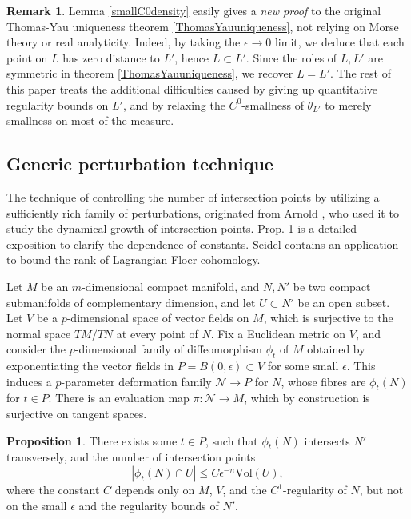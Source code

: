 \documentclass[a4paper]{article}
\theoremstyle{definition}
\newtheorem{rmk}{Remark}
\newtheorem{prop}[thm]{Proposition}
\begin{document}
\begin{rmk}
Lemma \ref{smallC0density} easily gives a \emph{new proof} to the original Thomas-Yau uniqueness theorem \ref{ThomasYauuniqueness}, not relying on Morse theory or real analyticity. Indeed, by taking the $\epsilon\to 0$ limit, we deduce that each point on $L$ has zero distance to $L'$, hence $L\subset L'$. Since the roles of $L,L'$ are symmetric in theorem \ref{ThomasYauuniqueness}, we recover $L=L'$. The rest of this paper treats the additional difficulties caused by giving up quantitative regularity bounds on $L'$, and by relaxing the $C^0$-smallness of $\theta_{L'}$ to merely smallness on most of the measure.
\end{rmk}



\subsection{Generic perturbation technique}



The technique of controlling the number of intersection points by utilizing a sufficiently rich family of perturbations, originated from Arnold \cite{Arnold}, who used it to study the dynamical growth of intersection points.  Prop. \ref{Arnold} is a detailed exposition to clarify the dependence of constants. Seidel \cite[Lecture 5]{Seidel} contains an application to bound the rank of Lagrangian Floer cohomology.







Let $M$ be an $m$-dimensional compact manifold, and $N, N'$ be two compact submanifolds of complementary dimension, and let $U\subset N'$ be an open subset. 
Let $V$ be a $p$-dimensional space of vector fields on $M$, which is surjective to the normal space $TM/TN$ at every point of $N$. Fix a Euclidean metric on $V$, and consider the $p$-dimensional family of diffeomorphism $\phi_t$ of $M$ obtained by exponentiating the vector fields in $P=B(0,\epsilon)\subset V$ for some small  $\epsilon$.  This induces a $p$-parameter deformation family 
$\mathcal{N}\to P$ for $N$, whose fibres are $\phi_t(N)$ for $t\in P$. There is an evaluation map $\pi: \mathcal{N}\to M$, which by construction is surjective on tangent spaces.



\begin{prop}\label{Arnold}
There exists some $t\in P$, such that $\phi_t(N)$ intersects $N'$ transversely, and the number of intersection points 
\[
|\phi_t(N)\cap U| \leq C\epsilon^{-n} \text{Vol}(U), 
\]	
where the constant $C$ depends only on $M$, $V$, and the $C^1$-regularity of $N$, but not on the small $\epsilon$ and the regularity bounds of $N'$.
\end{prop}
\end{document}
